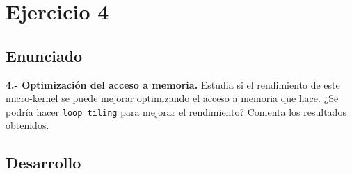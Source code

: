 \section{Ejercicio 4}
\subsection{Enunciado}
\begin{ejer}
    \textbf{4.- Optimización del acceso a memoria.} Estudia si el rendimiento de este micro-kernel se puede
    mejorar optimizando el acceso a memoria que hace. ¿Se podría hacer \texttt{loop tiling} para mejorar el
    rendimiento? Comenta los resultados obtenidos.
\end{ejer}
\subsection{Desarrollo}

